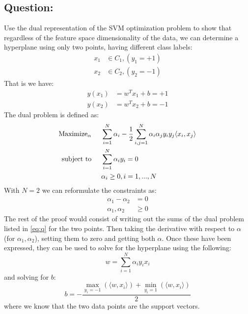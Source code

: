 \documentclass{article}
\begin{document}
\subsection{Question:}
Use the dual representation of the SVM optimization problem to show that regardless of the feature space dimensionality of the data, we can determine a hyperplane using only two points, having different class labels:
\begin{align}
x_1 &\in C_1,(y_1 = +1) \\
x_2 &\in C_2, (y_2 = -1)
\end{align}
That is we have:
\begin{align}
y(x_1) &= w^T x_1 + b = +1 \\
y(x_2) &= w^T x_2 + b = -1
\end{align}
The dual problem is defined as:
\begin{align}
\label{eq:q}
\text{Maximize}_\alpha \hspace{0.5cm}& \sum\limits_{i=1}^N \alpha_i - \frac{1}{2} \sum\limits_{i,j=1}^N \alpha_i \alpha_j y_i y_j \langle x_i, x_j \rangle \\
\text{subject to} \hspace{0.5cm}& \sum\limits_{i=1}^N \alpha_iy_i = 0 \\
 \hspace{0.5cm}& \alpha_i \geq 0 ,i =1,...,N
\end{align}
With $N=2$ we can reformulate the constraints as:
\begin{align}
\alpha_1 - \alpha_2 &= 0 \\
\alpha_1,\alpha_2 &\geq 0
\end{align}
The rest of the proof would consist of writing out the sums of the dual problem listed in \eqref{eq:q} for the two points. Then taking the derivative with respect to $\alpha$ (for $\alpha_1,\alpha_2$), setting them to zero and getting both $\alpha$. Once these have been expressed, they can be used to solve for the hyperplane using the following:
\begin{equation}
w = \sum\limits_{i=1}^N \alpha_i y_i x_i
\end{equation}
and solving for $b$:
\begin{equation}
b = - \dfrac{\max_{y_i = -1} ( \langle w,x_i \rangle ) + \min_{y_i=1} ( \langle w,x_i \rangle )}{2}
\end{equation}
where we know that the two data points are the support vectors.
\end{document}
